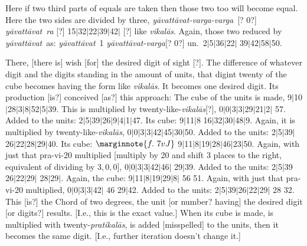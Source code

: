 \documentclass[12pt]{book}
\def\pratikalas{\textit{prati\-ka\-l\=as}}
\def\ya{\textit{y\=avat\-t\=avat}}
\def\yava{\textit{y\=avat\-t\=avat-varga}}
\def\yavava{\textit{y\=avat\-t\=avat-varga-varga}}
\def\vikalas{\textit{vi\-ka\-l\=as}}
\def\danda{$|$}
\begin{document}
\newpage

Here if two third parts of equals are taken then those two too will become equal.   Here the two sides
are divided by three, \yavava\ [? 0?] \ya\ \textit{ra} [?] 15\danda 32\danda 22\danda 39\danda 42\danda
[?] like \vikalas.
Again, those two reduced by \ya\ as: \ya\ 1 \yava [? 0?] un.\ 2\danda 5\danda 36\danda 22\danda 
39\danda 42\danda 58\danda 50. 

There, [there is] wish [for] the desired digit of sight [?].  The difference of whatever digit and the
digits standing in the amount of units, that digint twenty of the cube  becomes having the form like \vikalas. 
It becomes one desired digit. Its production [is?] conceived [as?] this approach: The cube of the 
units is made, 9\danda 10\danda 28\danda 3\danda 8\danda 52\danda 5\danda 39. 
This is multiplied by twenty-like-\vikalas [?], 0\danda 0\danda 3\danda 3\danda 29\danda 21\danda 2\danda
57. Added to the units: 2\danda 5\danda 39\danda 26\danda 9\danda 4\danda 1\danda 47.
Its cube: 9\danda 11\danda 8 16\danda 32\danda 30\danda 48\danda 9. Again, it is multiplied
by twenty-like-\vikalas, 0\danda 0\danda 3\danda 3\danda 42\danda 45\danda 30\danda 50.
Added to the units: 2\danda 5\danda 39\danda 26\danda 22\danda 28\danda 29\danda 40.
Its cube:
$\marginnote{f.~7v J} $
9\danda 11\danda 8\danda 19\danda 28\danda 46\danda 23\danda 50. 
Again, with just that pra-vi-20 multiplied [multiply by 20 and shift 3 places to the right, 
equivalent of dividing by $3,0,0$], 0\danda 0\danda 3\danda 3\danda 42\danda 46\danda
29\danda 39. Added to the units: 2\danda 5\danda 39 26\danda 22\danda 29\danda 
28\danda 29\danda. Again, the cube: 9\danda 11\danda 8\danda 19\danda 29\danda 8\danda
56 51. Again, with just that pra-vi-20 multiplied, 0\danda 0\danda 3\danda 3\danda 42\danda
46 29\danda 42. Added to the units: 2\danda 5\danda 39\danda 26\danda 22\danda 29\danda
28 32. This [is?] the Chord of two degrees, the unit [or number? having] the desired digit 
[or digits?] results. [I.e., this is the exact value.] 
When its cube is made, is multiplied with twenty-\pratikalas, is added [misspelled] to the units, then it
becomes the same digit. [I.e., further iteration doesn't change it.]

\newpage
\end{document}
